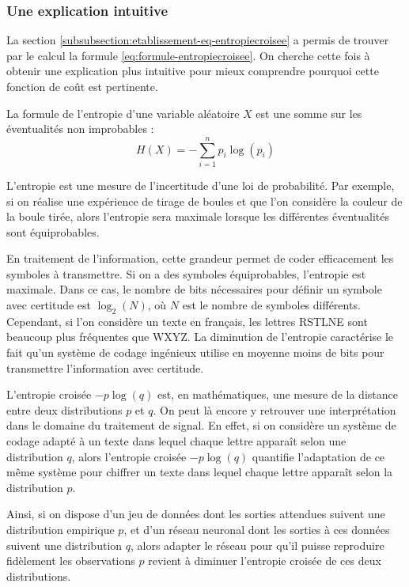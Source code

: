 \subsubsection{Une explication intuitive}

La section \ref{subsubsection:etablissement-eq-entropiecroisee} a permis de trouver par le calcul la formule \ref{eq:formule-entropiecroisee}.
On cherche cette fois à obtenir une explication plus intuitive pour mieux comprendre pourquoi cette fonction de coût est pertinente.

La formule de l'entropie d'une variable aléatoire $X$ est une somme sur les éventualités non improbables :
\begin{equation}
 H(X) = -\sum_{i=1}^{n} p_i\log\left(p_i\right)
\end{equation}

L'entropie est une mesure de l'incertitude d'une loi de probabilité. Par exemple, si on réalise une expérience de tirage de boules et que l'on considère
la couleur de la boule tirée, alors l'entropie sera maximale lorsque les différentes éventualités sont équiprobables.

En traitement de l'information, cette grandeur permet de coder efficacement les symboles à transmettre. Si on a des symboles équiprobables,
l'entropie est maximale. Dans ce cas, le nombre de bits nécessaires pour définir un symbole avec certitude est $\log_2\left(N\right)$, où $N$ est le nombre
de symboles différents. Cependant, si l'on considère un texte en français, les lettres RSTLNE sont beaucoup plus fréquentes que WXYZ. La diminution de l'entropie
caractérise le fait qu'un système de codage ingénieux utilise en moyenne moins de bits pour transmettre l'information avec certitude.

L'entropie croisée $-p\log\left(q\right)$ est, en mathématiques, une mesure de la distance entre deux distributions $p$ et $q$. On peut là encore y 
retrouver une interprétation dans le domaine du traitement de signal. 
En effet, si on considère un système de codage adapté à un texte dans lequel chaque lettre apparaît selon une distribution $q$, alors
l'entropie croisée $-p\log\left(q\right)$ quantifie l'adaptation de ce même système pour chiffrer un texte dans lequel 
chaque lettre apparaît selon la distribution $p$.

Ainsi, si on dispose d'un jeu de données dont les sorties attendues suivent une distribution empirique $p$, et d'un réseau neuronal dont les sorties
à ces données suivent une distribution $q$, alors adapter le réseau pour qu'il puisse reproduire fidèlement les observations $p$ revient 
à diminuer l'entropie croisée de ces deux distributions.

